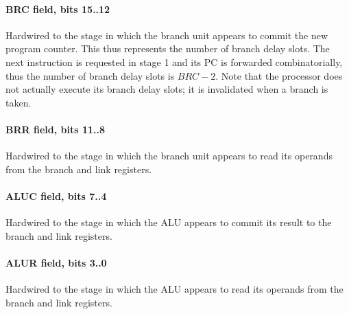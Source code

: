 \paragraph*{BRC field, bits 15..12}
Hardwired to the stage in which the branch unit appears to commit the new
program counter. This thus represents the number of branch delay slots. The next
instruction is requested in stage 1 and its PC is forwarded combinatorially,
thus the number of branch delay slots is $BRC - 2$. Note that the \rvex{}
processor does not actually execute its branch delay slots; it is invalidated
when a branch is taken.
\paragraph*{BRR field, bits 11..8}
Hardwired to the stage in which the branch unit appears to read its operands
from the branch and link registers.
\paragraph*{ALUC field, bits 7..4}
Hardwired to the stage in which the ALU appears to commit its result to the
branch and link registers.
\paragraph*{ALUR field, bits 3..0}
Hardwired to the stage in which the ALU appears to read its operands from the
branch and link registers.

